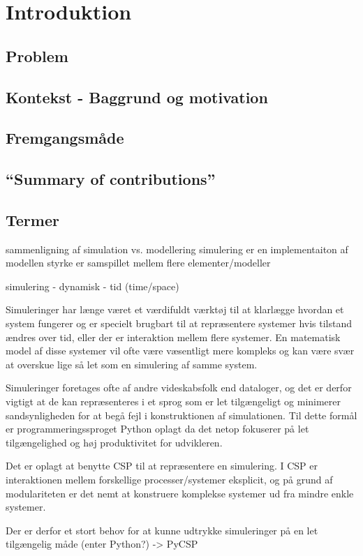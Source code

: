 \chapter{Introduktion}
  \section{Problem}	 
  \section{Kontekst - Baggrund og motivation}
  \section{Fremgangsmåde}
  \section{``Summary of contributions''}
  \section{Termer}


sammenligning af simulation vs. modellering
  simulering er en implementaiton af modellen
  styrke er samspillet mellem flere elementer/modeller


simulering - dynamisk - tid (time/space)



Simuleringer har længe været et værdifuldt værktøj til at klarlægge hvordan et 
system fungerer og er specielt brugbart til at repræsentere systemer hvis 
tilstand ændres over tid, eller der er interaktion mellem flere systemer. En 
matematisk model af disse systemer vil ofte være væsentligt mere kompleks og 
kan være svær at overskue lige så let som en simulering af samme system. 

Simuleringer foretages ofte af andre videskabsfolk end dataloger, og det er 
derfor vigtigt at de kan repræsenteres i et sprog som er let tilgængeligt og 
minimerer sandsynligheden for at begå fejl i konstruktionen af simulationen.  
Til dette formål er programmeringssproget Python oplagt da det netop fokuserer 
på let tilgængelighed og høj produktivitet for udvikleren. 

Det er oplagt at benytte CSP\cite{hoare-csp} til at repræsentere en simulering.  
I CSP er interaktionen mellem forskellige processer/systemer eksplicit, og på 
grund af modulariteten er det nemt at konstruere komplekse systemer ud fra 
mindre enkle systemer. 



Der er derfor et stort behov for at kunne udtrykke simuleringer på en let 
tilgængelig måde (enter Python?) -> PyCSP




  

